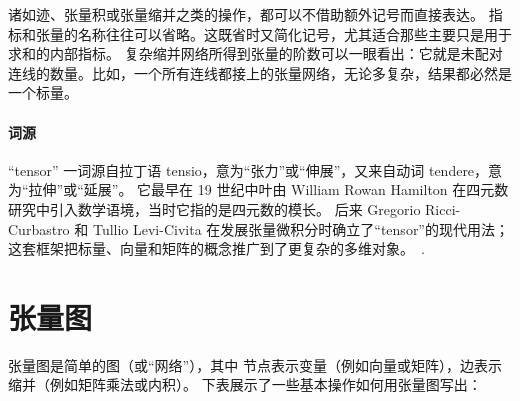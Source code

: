 诸如迹、张量积或张量缩并之类的操作，都可以不借助额外记号而直接表达。
指标和张量的名称往往可以省略。这既省时又简化记号，尤其适合那些主要只是用于求和的内部指标。
复杂缩并网络所得到张量的阶数可以一眼看出：它就是未配对连线的数量。比如，一个所有连线都接上的张量网络，无论多复杂，结果都必然是一个标量。


\paragraph{词源}
“tensor” 一词源自拉丁语 tensio，意为“张力”或“伸展”，又来自动词 tendere，意为“拉伸”或“延展”。
它最早在 19 世纪中叶由 William Rowan Hamilton 在四元数研究中引入数学语境，当时它指的是四元数的模长。
后来 Gregorio Ricci-Curbastro 和 Tullio Levi-Civita 在发展张量微积分时确立了“tensor”的现代用法；这套框架把标量、向量和矩阵的概念推广到了更复杂的多维对象。~\cite{tensor_etymology_russo, hamilton_tensor}.


\tableofcontents
\clearpage


\section{张量图}
张量图是简单的图（或“网络”），其中
节点表示变量（例如向量或矩阵），边表示
缩并（例如矩阵乘法或内积）。
下表展示了一些基本操作如何用张量图写出：

\newenvironment{compress}{
  \renewcommand{\arraystretch}{0.6} %
  \setlength{\arraycolsep}{2pt}     %
  \vspace{.3em}
}{
  \vspace{.3em}
  \renewcommand{\arraystretch}{1}   %
  \setlength{\arraycolsep}{5pt}     %
}

